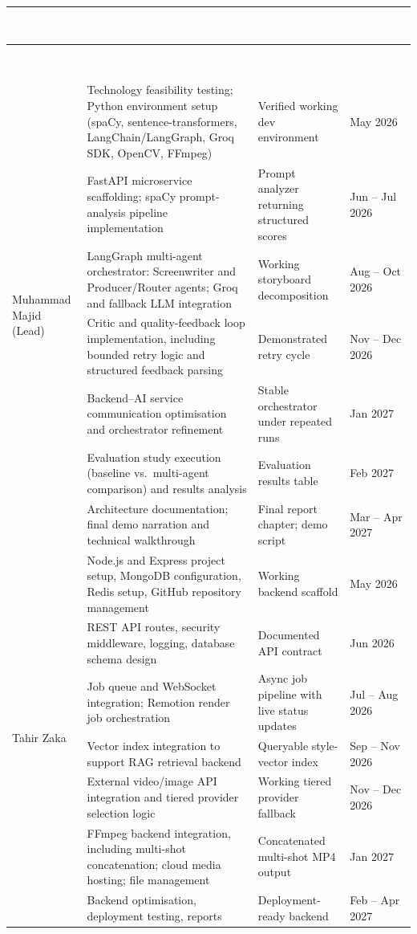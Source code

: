 \documentclass[11pt,a4paper]{article}
\newcommand{\tblhead}[1]{\cellcolor{headerblue}\textcolor{white}{\textbf{#1}}}
\begin{document}
\begin{center}
\begin{longtable}{|p{2.2cm}|p{5.9cm}|p{3.4cm}|p{2.1cm}|}
\hline
\tblhead{Member} & \tblhead{Individual Tasks} & \tblhead{Key Deliverable} & \tblhead{Tentative Date} \\
\hline
\endfirsthead
\hline
\tblhead{Member} & \tblhead{Individual Tasks} & \tblhead{Key Deliverable} & \tblhead{Tentative Date} \\
\hline
\endhead

\multirow{7}{2.2cm}{Muhammad Majid (Lead)}
 & Technology feasibility testing; Python environment setup (spaCy, sentence-transformers, LangChain/LangGraph, Groq SDK, OpenCV, FFmpeg) & Verified working dev environment & May 2026 \\
 & FastAPI microservice scaffolding; spaCy prompt-analysis pipeline implementation & Prompt analyzer returning structured scores & Jun -- Jul 2026 \\
 & LangGraph multi-agent orchestrator: Screenwriter and Producer/Router agents; Groq and fallback LLM integration & Working storyboard decomposition & Aug -- Oct 2026 \\
 & Critic and quality-feedback loop implementation, including bounded retry logic and structured feedback parsing & Demonstrated retry cycle & Nov -- Dec 2026 \\
 & Backend--AI service communication optimisation and orchestrator refinement & Stable orchestrator under repeated runs & Jan 2027 \\
 & Evaluation study execution (baseline vs.\ multi-agent comparison) and results analysis & Evaluation results table & Feb 2027 \\
 & Architecture documentation; final demo narration and technical walkthrough & Final report chapter; demo script & Mar -- Apr 2027 \\
\hline

\multirow{7}{2.2cm}{Tahir Zaka}
 & Node.js and Express project setup, MongoDB configuration, Redis setup, GitHub repository management & Working backend scaffold & May 2026 \\
 & REST API routes, security middleware, logging, database schema design & Documented API contract & Jun 2026 \\
 & Job queue and WebSocket integration; Remotion render job orchestration & Async job pipeline with live status updates & Jul -- Aug 2026 \\
 & Vector index integration to support RAG retrieval backend & Queryable style-vector index & Sep -- Nov 2026 \\
 & External video/image API integration and tiered provider selection logic & Working tiered provider fallback & Nov -- Dec 2026 \\
 & FFmpeg backend integration, including multi-shot concatenation; cloud media hosting; file management & Concatenated multi-shot MP4 output & Jan 2027 \\
 & Backend optimisation, deployment testing, reports & Deployment-ready backend & Feb -- Apr 2027 \\
\hline


\end{longtable}
\end{center}
\end{document}
